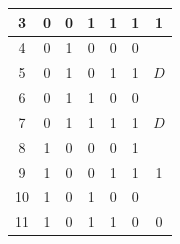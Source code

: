 \begin{center}
\begin{minipage}[t]{0.45\textwidth}
\begin{tabular}{ccccccc}
\multicolumn{1}{c|}{3}                           & 0                         & 0                         & 1                         & \multicolumn{1}{c|}{1}                         & \multicolumn{1}{c|}{1}                             & \multirow{-2}{*}{1}              \\ \hline
\multicolumn{1}{c|}{4}                           & 0                         & 1                         & 0                         & \multicolumn{1}{c|}{0}                         & \multicolumn{1}{c|}{0}                             &                                  \\
\multicolumn{1}{c|}{5}                           & 0                         & 1                         & 0                         & \multicolumn{1}{c|}{1}                         & \multicolumn{1}{c|}{1}                             & \multirow{-2}{*}{$D$}            \\ \hline
\multicolumn{1}{c|}{6}                           & 0                         & 1                         & 1                         & \multicolumn{1}{c|}{0}                         & \multicolumn{1}{c|}{0}                             &                                  \\
\multicolumn{1}{c|}{7}                           & 0                         & 1                         & 1                         & \multicolumn{1}{c|}{1}                         & \multicolumn{1}{c|}{1}                             & \multirow{-2}{*}{$D$}            \\ \hline
\multicolumn{1}{c|}{8}                           & 1                         & 0                         & 0                         & \multicolumn{1}{c|}{0}                         & \multicolumn{1}{c|}{1}                             &                                  \\
\multicolumn{1}{c|}{9}                           & 1                         & 0                         & 0                         & \multicolumn{1}{c|}{1}                         & \multicolumn{1}{c|}{1}                             & \multirow{-2}{*}{1}              \\ \hline
\multicolumn{1}{c|}{10}                          & 1                         & 0                         & 1                         & \multicolumn{1}{c|}{0}                         & \multicolumn{1}{c|}{0}                             &                                  \\
\multicolumn{1}{c|}{11}                          & 1                         & 0                         & 1                         & \multicolumn{1}{c|}{1}                         & \multicolumn{1}{c|}{0}                             & \multirow{-2}{*}{0}              \\ \hline

\end{tabular}
\end{minipage}
\end{center}
